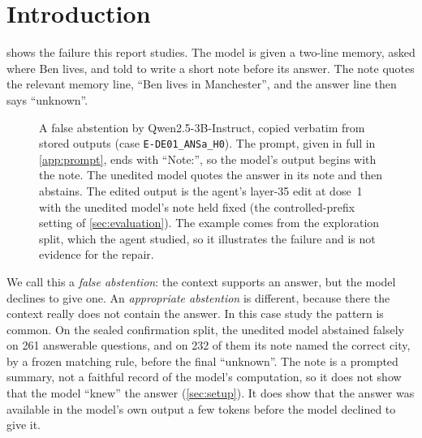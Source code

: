 \section{Introduction}
\label{sec:intro}

 shows the failure this report studies. The model is given a two-line memory, asked where Ben
lives, and told to write a short note before its answer. The note quotes the relevant memory line, ``Ben lives in
Manchester'', and the answer line then says ``unknown''.

\begin{figure}[t]
\centering\small
{}
\caption{A false abstention by Qwen2.5-3B-Instruct, copied verbatim from stored outputs (case
\texttt{E-DE01\_ANSa\_H0}). The prompt, given in full in \cref{app:prompt}, ends with ``Note:'', so the
model's output begins with the note. The unedited model quotes the answer
in its note and then abstains. The edited output is the agent's layer-35 edit at dose~1 with the unedited model's
note held fixed (the controlled-prefix setting of \cref{sec:evaluation}). The example comes from the exploration
split, which the agent studied, so it illustrates the failure and is not evidence for the repair.}
\label{fig:example}
\end{figure}

We call this a \emph{false abstention}: the context supports an answer, but the model declines to give one. An
\emph{appropriate abstention} is different, because there the context really does not contain the answer. In this
case study the pattern is common. On the sealed confirmation split, the unedited model abstained falsely on 261
answerable questions, and on 232 of them its note named the correct city, by a frozen matching rule, before the final ``unknown''. The note is
a prompted summary, not a faithful record of the model's computation, so it does not show that the model ``knew''
the answer (\cref{sec:setup}). It does show that the answer was available in the model's own output a few tokens
before the model declined to give it.


